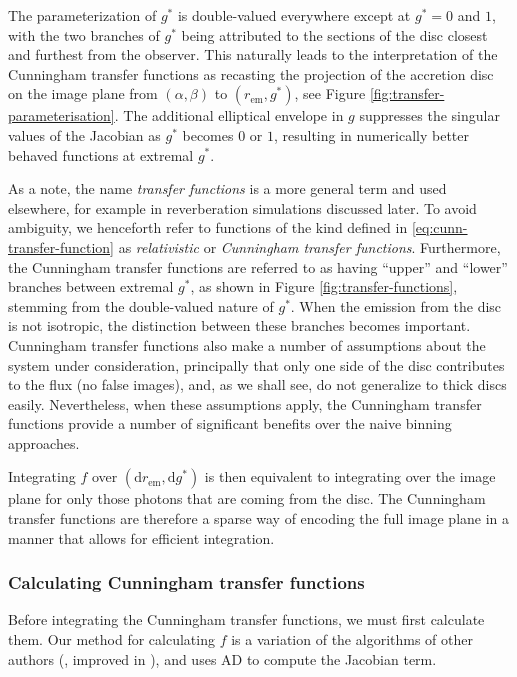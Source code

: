 \documentclass[fleqn,usenatbib]{mnras}
\renewcommand{\d}{\text{d}}
\begin{document}
The parameterization of $g^\ast$ is double-valued everywhere except at $g^\ast =
0$ and $1$, with the two branches of $g^\ast$ being attributed to the sections of the
disc closest and furthest from the observer. This naturally leads to the
interpretation of the Cunningham transfer functions as recasting the projection
of the accretion disc on the image plane from $(\alpha, \beta)$ to
$(r_\text{em}, g^\ast)$, see Figure \ref{fig:transfer-parameterisation}.  The
additional elliptical envelope in $g$ suppresses the singular values of the
Jacobian as $g^\ast$ becomes $0$ or $1$, resulting in numerically better behaved
functions at extremal $g^\ast$.

As a note, the name \emph{transfer functions} is a more general term and used
elsewhere, for example in reverberation simulations discussed later. To avoid
ambiguity, we henceforth refer to functions of the kind defined in
\eqref{eq:cunn-transfer-function} as \emph{relativistic} or \emph{Cunningham
transfer functions}. Furthermore, the Cunningham transfer functions are referred
to as having ``upper'' and ``lower'' branches between extremal $g^\ast$, as
shown in Figure \ref{fig:transfer-functions}, stemming from the double-valued
nature of $g^\ast$. When the emission from the disc is not isotropic, the
distinction between these branches becomes important. Cunningham transfer
functions also make a number of assumptions about the system under
consideration, principally that only one side of the disc contributes to the
flux (no false images), and, as we shall see, do not generalize to thick discs
easily. Nevertheless, when these assumptions apply, the Cunningham transfer
functions provide a number of significant benefits over the naive binning
approaches.

Integrating $f$ over $(\d r_\text{em}, \d g^\ast)$ is then equivalent to
integrating over the image plane for only those photons that are coming from the
disc. The Cunningham transfer functions are therefore a sparse way of encoding
the full image plane in a manner that allows for efficient integration.

\subsubsection{Calculating Cunningham transfer functions}

Before integrating the Cunningham transfer functions, we must first calculate
them. Our method for calculating $f$ is a variation of the algorithms of other
authors (\citealp{speith_photon_1995,bambi_testing_2017}, improved in
\citealp{abdikamalov_public_2019}), and uses AD to compute the Jacobian term.
\end{document}
